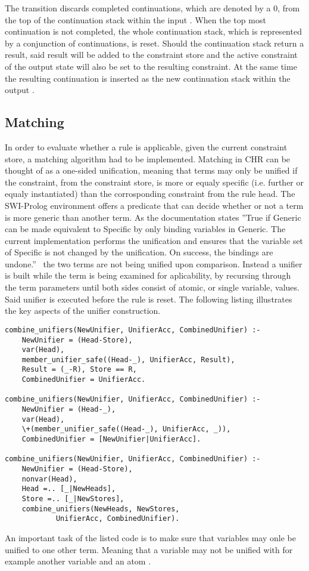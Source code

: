 The  transition discards completed continuations, which are denoted by a 0, from the top of the continuation stack within the input .
When the top most continuation is not completed, the whole continuation stack, which is represented by a conjunction of continuations, is reset.
Should the continuation stack return a result, said result will be added to the constraint store and the active constraint of the output state will also be set to the resulting constraint.
At the same time the resulting continuation is inserted as the new continuation stack within the output .

\subsection{Matching}

In order to evaluate whether a rule is applicable, given the current constraint store, a matching algorithm had to be implemented.
Matching in CHR can be thought of as a one-sided unification, meaning that terms may only be unified if the constraint, from the constraint store, is more or equaly specific (i.e. further or equaly instantiated) than the corrosponding constraint from the rule head.
The SWI-Prolog environment offers a predicate  that can decide whether or not a term is more generic than another term.
As the documentation states ''True if Generic can be made equivalent to Specific by only binding variables in Generic. The current implementation performs the unification and ensures that the variable set of Specific is not changed by the unification. On success, the bindings are undone.''~\cite{swipl:doc:subsumes_term} the two terms are not being unified upon comparison.
Instead a unifier is built while the term is being examined for aplicability, by recursing through the term parameters until both sides consist of atomic, or single variable, values.
Said unifier is executed before the rule is reset.
The following listing illustrates the key aspects of the unifier construction.

\begin{lstlisting}[frame=single, caption=excerpt of the code constructing the unifier for two structurally equivilant terms, label={lst:unif}]
combine_unifiers(NewUnifier, UnifierAcc, CombinedUnifier) :-
    NewUnifier = (Head-Store),
    var(Head),
    member_unifier_safe((Head-_), UnifierAcc, Result),
    Result = (_-R), Store == R,
    CombinedUnifier = UnifierAcc.

combine_unifiers(NewUnifier, UnifierAcc, CombinedUnifier) :-
    NewUnifier = (Head-_),
    var(Head),
    \+(member_unifier_safe((Head-_), UnifierAcc, _)),
    CombinedUnifier = [NewUnifier|UnifierAcc].

combine_unifiers(NewUnifier, UnifierAcc, CombinedUnifier) :-
    NewUnifier = (Head-Store),
    nonvar(Head),
    Head =.. [_|NewHeads],
    Store =.. [_|NewStores],
    combine_unifiers(NewHeads, NewStores,
            UnifierAcc, CombinedUnifier).
\end{lstlisting}

\noindent An important task of the listed code is to make sure that variables may onle be unified to one other term.
Meaning that a variable  may not be unified with for example another variable  and an atom .



\newpage